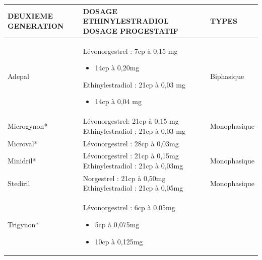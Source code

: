 \begin{table}[H]
  \centering
  \renewcommand{\arraystretch}{1.5}
  \begin{spacing}{1.35} %
  \begin{tabularx}{\textwidth}{|X|p{8cm}|X|}
      \hline
      \textbf{DEUXIEME  \newline GENERATION} & \textbf{DOSAGE ETHINYLESTRADIOL \newline DOSAGE PROGESTATIF} & \textbf{TYPES}  \\
      \hline
      Adepal & Lévonorgestrel : 7cp à 0,15 mg
      \begin{itemize}[label={}, nosep]
        \item \hspace{20mm}14cp à 0,20mg 
    \end{itemize} 
    Ethinylestradiol : 21cp à 0,03 mg 
    \begin{itemize}[label={}, nosep]
      \item \hspace{22mm}14cp à 0,04 mg
    \end{itemize}
     & Biphasique \\
      \hline
      Microgynon* & Lévonorgestrel: 21cp à 0,15 mg 
      \newline
      Ethinylestradiol :  21cp à 0,03 mg
& Monophasique \\
\hline
Microval* & Lévonorgestrel : 28cp à 0,03mg 
&  \\  
\hline
Minidril* & Lévonorgestrel : 21cp à 0,15mg  
\newline
Ethinylestradiol : 21cp à 0,03mg 
& Monophasique \\
\hline
Stediril & Norgestrel :         21cp à 0,50mg 
\newline
Ethinylestradiol : 21cp à 0,05mg 
& Monophasique \\
\hline
Trigynon* & Lévonorgestrel : 6cp à 0,05mg  
\begin{itemize}[label={}, nosep]
  \item \hspace{22mm}5cp à 0,075mg 
  \item \hspace{22mm}10cp à 0,125mg 
\end{itemize}


\end{tabularx}
\end{spacing}
\end{table}
